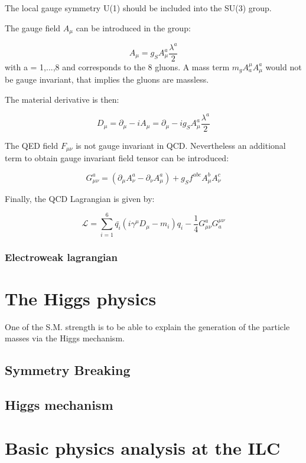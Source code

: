     The local gauge symmetry U(1) should be included into the SU(3) group.
    
    The gauge field $A_{\mu}$ can be introduced in the group:
    
    \begin{equation}
        A_{\mu} = g_S A^a_{\mu}\frac{\lambda^a}{2}
    \end{equation} 
    with a = 1,...,8 and corresponds to the 8 gluons.
    A mass term  $m_g A^{\mu}_a A^a_{\mu}$ would not be gauge invariant, that implies the gluons are massless.

    The material derivative is then:

    \begin{equation}
        D_{\mu} = \partial_{\mu} - i A_{\mu} = \partial_{\mu} - i g_S A^a_{\mu} \frac{\lambda^a}{2}
    \end{equation}

    The QED field $F_{\mu \nu}$ is not gauge invariant in QCD.
    Nevertheless an additional term to obtain gauge invariant field tensor can be introduced:
    
    \begin{equation}
        G^a_{\mu \nu} = \left( \partial_{\mu} A^a_{\nu} - \partial_{\nu} A^a_{\mu} \right) + g_S f^{abc} A^b_{\mu} A^c_{\nu}
    \end{equation} 

    Finally, the QCD Lagrangian is given by:

    \begin{equation}
        \mathcal{L} = \sum_{i=1}^6  \bar{q_i} \left(i \gamma^{\mu}D_{\mu} -m_i \right)q_i - \frac{1}{4} G_{\mu \nu}^{a} G_{a}^{\mu \nu}
    \end{equation}
    
    \subsubsection{Electroweak lagrangian}
    

  \section{The Higgs physics}

	One of the S.M. strength is to be able to explain the generation of the particle masses via the Higgs mechanism.
    
    \subsection{Symmetry Breaking}

    \subsection{Higgs mechanism}

  \section{Basic physics analysis at the ILC}


